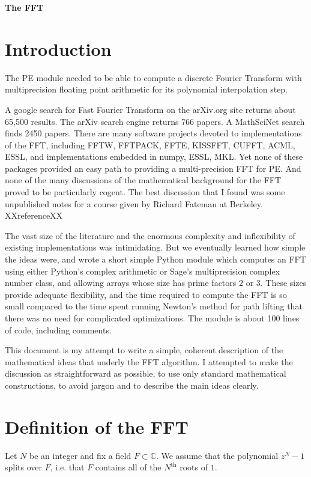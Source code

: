\documentclass[12pt, letter, oneside]{amsart}
\theoremstyle{definition}
\theoremstyle{plain}
\numberwithin{equation}{para}
\numberwithin{figure}{section}
\newcommand{\CC}{\mathbb{C}}
\renewcommand{\th}{\text{th}}
\begin{document}
\centerline{\Large\bf The FFT}
\bigskip
\section{Introduction}

The PE module needed to be able to compute a discrete Fourier Transform with
multiprecision floating point arithmetic for its polynomial interpolation step.

A google search for Fast Fourier Transform on the arXiv.org site returns about
65,500 results.  The arXiv search engine returns 766 papers. A MathSciNet search
finds 2450 papers.  There are many software projects devoted to implementations
of the FFT, including FFTW, FFTPACK, FFTE, KISSFFT, CUFFT, ACML, ESSL, and
implementations embedded in numpy, ESSL, MKL.  Yet none of these packages provided
an easy path to providing a multi-precision FFT for PE.  And none of the many
discussions of the mathematical background for the FFT proved to be particularly
cogent.  The best discussion that I found was some unpublished notes for a course
given by Richard Fateman at Berkeley. XXreferenceXX

The vast size of the literature and the enormous complexity and inflexibility of
existing implementations was intimidating.  But we eventually learned how simple
the ideas were, and wrote a short simple Python module which computes an FFT
using either Python's complex arithmetic or Sage's multiprecision complex number
class, and allowing arrays whose size has prime factors $2$ or $3$.  These sizes
provide adequate flexibility, and the time required to compute the FFT is so small
compared to the time spent running Newton's method for path lifting that there
was no need for complicated optimizations.  The module is about 100 lines of
code, including comments.

This document is my attempt to write a simple, coherent description of the
mathematical ideas that underly the FFT algorithm.  I attempted to make the
discussion as straightforward as possible, to use only standard mathematical
constructions, to avoid jargon and to describe the main ideas clearly.

\section{Definition of the FFT}
Let $N$ be an integer and fix a field $F\subset\CC$.  We assume that the
polynomial $z^N - 1$ splits over $F$, i.e. that $F$ contains all of
the $N^\th$ roots of $1$.
\end{document}

